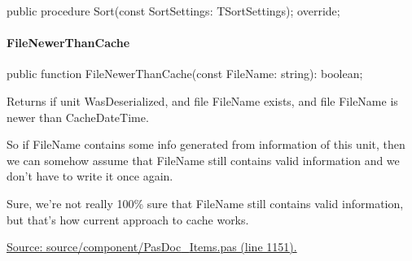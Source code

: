 \documentclass{report}
\newif\ifpdf
\begin{document}
\label{PasDoc_Items.TPasUnit-Sort}
\begin{list}{}{
\setlength{\itemindent}{0cm}
\setlength{\listparindent}{0cm}
\setlength{\leftmargin}{\evensidemargin}
\addtolength{\leftmargin}{\tmplength}
\settowidth{\labelsep}{X}
\addtolength{\leftmargin}{\labelsep}
\setlength{\labelwidth}{\tmplength}
}
\item[\textbf{Declaration}\hfill]
\ifpdf
\begin{flushleft}
\fi
\begin{ttfamily}
public procedure Sort(const SortSettings: TSortSettings); override;\end{ttfamily}

\ifpdf
\end{flushleft}
\fi

\end{list}
\paragraph*{FileNewerThanCache}\hspace*{\fill}

\label{PasDoc_Items.TPasUnit-FileNewerThanCache}
\begin{list}{}{
\setlength{\itemindent}{0cm}
\setlength{\listparindent}{0cm}
\setlength{\leftmargin}{\evensidemargin}
\addtolength{\leftmargin}{\tmplength}
\settowidth{\labelsep}{X}
\addtolength{\leftmargin}{\labelsep}
\setlength{\labelwidth}{\tmplength}
}
\item[\textbf{Declaration}\hfill]
\ifpdf
\begin{flushleft}
\fi
\begin{ttfamily}
public function FileNewerThanCache(const FileName: string): boolean;\end{ttfamily}

\ifpdf
\end{flushleft}
\fi

\par
\item[\textbf{Description}]
Returns if unit WasDeserialized, and file FileName exists, and file FileName is newer than CacheDateTime.

So if FileName contains some info generated from information of this unit, then we can somehow assume that FileName still contains valid information and we don't have to write it once again.

Sure, we're not really 100{\%} sure that FileName still contains valid information, but that's how current approach to cache works.\par
\href{https://github.com/pasdoc/pasdoc/blob/master/source/component/PasDoc_Items.pas#L1151}{Source: source/component/PasDoc{\_}Items.pas (line 1151).}

\end{list}
\end{document}

